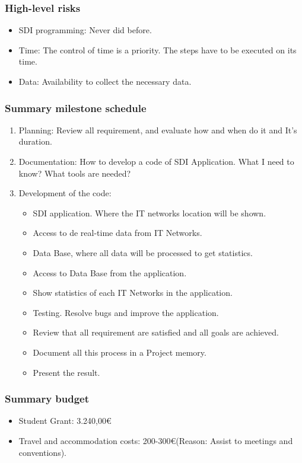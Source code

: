 \documentclass[draftclsnofoot,12pt,journal,onecolumn]{IEEEtran}
\begin{document}
\subsubsection{High-level risks}
\begin{itemize}
\item SDI programming: Never did before.
\item Time: The control of time is a priority. The steps have to be executed on its time.
\item Data: Availability to collect the necessary data.

\end{itemize}

\subsubsection{Summary milestone schedule}
\begin{enumerate}
\item Planning: Review all requirement, and evaluate how and when do it and It’s duration.
\item Documentation: How to develop a code of SDI Application. What I need to know? What tools are needed?
\item Development of the code:
\begin{itemize}
\item SDI application. Where the IT networks location will be shown.
\item Access to de real-time data from IT Networks.
\item Data Base, where all data will be processed to get statistics.
\item Access to Data Base from the application.
\item Show statistics of each IT Networks in the application.
\item Testing. Resolve bugs and improve the application.
\item Review that all requirement are satisfied and all goals are achieved.
\item Document all this process in a Project memory.
\item Present the result.
\end{itemize}


\end{enumerate}



\subsubsection{Summary budget}
\begin{itemize}
\item Student Grant: 3.240,00€
\item Travel and accommodation costs: 200-300€(Reason: Assist to meetings and
conventions).

\end{itemize}
\end{document}
